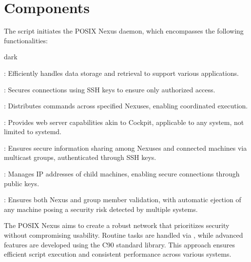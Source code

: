 \section{Components}
\label{sec:component}
The  script initiates the POSIX Nexus daemon, which encompasses the following functionalities:
\bigskip
\begin{baseBoxOne}{}{dark}
    \begin{posnexItemize}
        \item[\sA] : Efficiently handles data storage and retrieval to support various applications.
        \item[\sA] : Secures connections using SSH keys to ensure only authorized access.
        \item[\sA] : Distributes commands across specified Nexuses, enabling coordinated execution.
        \item[\sA] : Provides web server capabilities akin to Cockpit, applicable to any system, not limited to systemd.
        \item[\sA] : Ensures secure information sharing among Nexuses and connected machines via multicast groups, authenticated through SSH keys.
        \item[\sA] : Manages IP addresses of child machines, enabling secure connections through public keys.
        \item[\sA] : Ensures both Nexus and group member validation, with automatic ejection of any machine posing a security risk detected by multiple systems.
    \end{posnexItemize}
\end{baseBoxOne}
\bigskip
The POSIX Nexus aims to create a robust network that prioritizes security without compromising usability.
Routine tasks are handled via , while advanced features are developed using the C90 standard library.
This approach ensures efficient script execution and consistent performance across various systems.
\newpage

